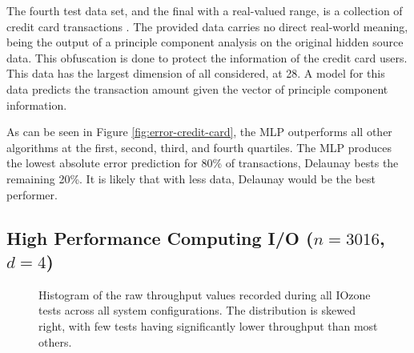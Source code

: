 \documentclass[smallextended,final]{svjour3}       %
\begin{document}
The fourth test data set, and the final with a real-valued range, is a
collection of credit card transactions \cite{pozzolo2015calibrating}. The
provided data carries no direct real-world meaning, being the output of a
principle component analysis on the original hidden source data. This
obfuscation is done to protect the information of the credit card users.
This data has the largest dimension of all considered, at 28. A model for
this data predicts the transaction amount given the vector of principle
component information.

As can be seen in Figure \ref{fig:error-credit-card}, the MLP outperforms
all other algorithms at the first, second, third, and fourth quartiles.
The MLP produces the lowest absolute error prediction for 80\% of
transactions, Delaunay bests the remaining 20\%. It is likely that with
less data, Delaunay would be the best performer.



\subsection{High Performance Computing I/O ($n = 3016$, $d = 4$)}

\begin{figure}
  \centering
  \caption{Histogram of the raw throughput values recorded during all
  IOzone tests across all system configurations. The distribution is skewed
  right, with few tests having significantly lower throughput than most
  others.}
\label{fig:hist-throughput}
\end{figure}
\end{document}
